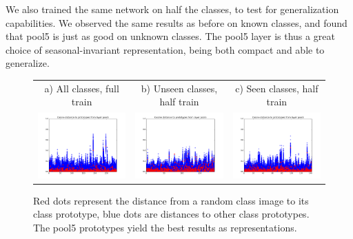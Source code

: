 We also trained the same network on half the classes, to test for generalization capabilities. We observed the same results as before on known classes, and found that pool5 is just as good on unknown classes. The pool5 layer is thus a great choice of seasonal-invariant representation, being both compact and able to generalize.

\begin{figure}[htb]
\centering
\begin{tabular}{ccc}
    a) All classes, full train & b) Unseen classes, half train & c) Seen classes, half train \\
    \includegraphics[width=0.33\linewidth]{images/classification/distances/all_classes_full_train/cos_distances_pool5}&
    \includegraphics[width=0.33\linewidth]{images/classification/distances/down_distances_up_train/cos_distances_pool5}&
    \includegraphics[width=0.33\linewidth]{images/classification/distances/up_distances_up_train/cos_distances_pool5}\\
\end{tabular}
\caption{Red dots represent the distance from a random class image to its class prototype, blue dots are distances to other class prototypes. The pool5 prototypes yield the best results as representations. }
\label{allclft}
\label{dwnclupt}
\label{upclupt}
\end{figure}